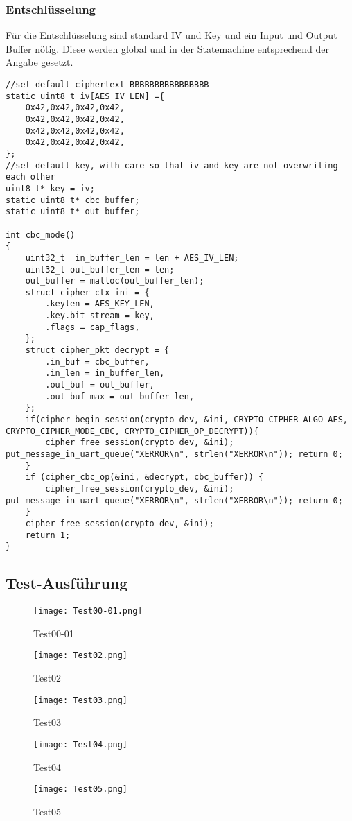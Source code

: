 \newpage
\subsubsection{Entschlüsselung}
Für die Entschlüsselung sind standard IV und Key und ein Input und Output Buffer nötig. Diese werden global und in der Statemachine entsprechend der Angabe gesetzt. 
\begin{lstlisting}[style=StyleC, captionpos=b, caption=UART-Initialisierung, label=UART-Initialisierung]
//set default ciphertext BBBBBBBBBBBBBBBB
static uint8_t iv[AES_IV_LEN] ={
    0x42,0x42,0x42,0x42,
    0x42,0x42,0x42,0x42,
    0x42,0x42,0x42,0x42,
    0x42,0x42,0x42,0x42,
};
//set default key, with care so that iv and key are not overwriting each other
uint8_t* key = iv;
static uint8_t* cbc_buffer;
static uint8_t* out_buffer;    

int cbc_mode()
{	
	uint32_t  in_buffer_len = len + AES_IV_LEN; 
	uint32_t out_buffer_len = len; 
	out_buffer = malloc(out_buffer_len);
	struct cipher_ctx ini = {
		.keylen = AES_KEY_LEN,
		.key.bit_stream = key,
		.flags = cap_flags,
	};
	struct cipher_pkt decrypt = {
		.in_buf = cbc_buffer,
		.in_len = in_buffer_len,
		.out_buf = out_buffer,
		.out_buf_max = out_buffer_len,
	};
	if(cipher_begin_session(crypto_dev, &ini, CRYPTO_CIPHER_ALGO_AES, CRYPTO_CIPHER_MODE_CBC, CRYPTO_CIPHER_OP_DECRYPT)){
		cipher_free_session(crypto_dev, &ini); put_message_in_uart_queue("XERROR\n", strlen("XERROR\n")); return 0;
	} 
	if (cipher_cbc_op(&ini, &decrypt, cbc_buffer)) {
		cipher_free_session(crypto_dev, &ini); put_message_in_uart_queue("XERROR\n", strlen("XERROR\n")); return 0;
	}
	cipher_free_session(crypto_dev, &ini);
	return 1;
}
\end{lstlisting}


\newpage
\subsection{Test-Ausführung}
\begin{figure}[!htb]
    \centering
    \texttt{[image: Test00-01.png]}
    \caption{Test00-01}
    \label{caption:Test00-01}
\end{figure}
\begin{figure}[!htb]
    \centering
    \texttt{[image: Test02.png]}
    \caption{Test02}
    \label{caption:Test02}
\end{figure}
\begin{figure}[!htb]
    \centering
    \texttt{[image: Test03.png]}
    \caption{Test03}
    \label{caption:Test03}
\end{figure}
\begin{figure}[!htb]
    \centering
    \texttt{[image: Test04.png]}
    \caption{Test04}
    \label{caption:Test04}
\end{figure}
\begin{figure}[!htb]
    \centering
    \texttt{[image: Test05.png]}
    \caption{Test05}
    \label{caption:Test05}
\end{figure}
